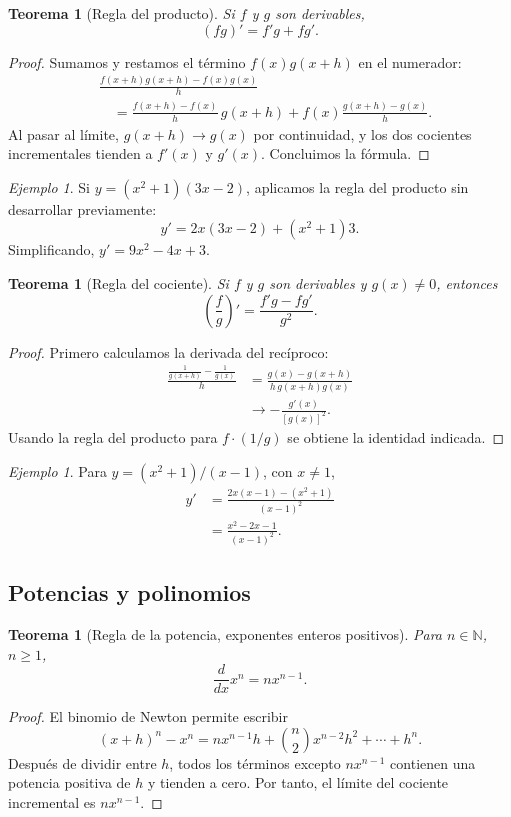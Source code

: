 \documentclass[12pt]{article}
\newtheorem{teorema}[definicion]{Teorema}
\theoremstyle{remark}
\newtheorem{ejemplo}[definicion]{Ejemplo}
\begin{document}
\begin{teorema}[Regla del producto]
Si $f$ y $g$ son derivables,
\[\boxed{(fg)'=f'g+fg'.}\]
\end{teorema}
\begin{proof}
Sumamos y restamos el término $f(x)g(x+h)$ en el numerador:
\begin{align*}
&\frac{f(x+h)g(x+h)-f(x)g(x)}h\\
&\quad=\frac{f(x+h)-f(x)}h\,g(x+h)
+f(x)\frac{g(x+h)-g(x)}h.
\end{align*}
Al pasar al límite, $g(x+h)\to g(x)$ por continuidad, y los dos cocientes incrementales tienden a $f'(x)$ y $g'(x)$. Concluimos la fórmula.
\end{proof}

\begin{ejemplo}
Si $y=(x^2+1)(3x-2)$, aplicamos la regla del producto sin desarrollar previamente:
\[
y'=2x(3x-2)+(x^2+1)3.
\]
Simplificando, $\boxed{y'=9x^2-4x+3}$.
\end{ejemplo}

\begin{teorema}[Regla del cociente]
Si $f$ y $g$ son derivables y $g(x)\ne0$, entonces
\[
\boxed{\left(\frac f g\right)'=\frac{f'g-fg'}{g^2}.}
\]
\end{teorema}
\begin{proof}
Primero calculamos la derivada del recíproco:
\begin{align*}
\frac{\frac1{g(x+h)}-\frac1{g(x)}}h
&=\frac{g(x)-g(x+h)}{h\,g(x+h)g(x)}\\
&\longrightarrow-\frac{g'(x)}{[g(x)]^2}.
\end{align*}
Usando la regla del producto para $f\cdot(1/g)$ se obtiene la identidad indicada.
\end{proof}

\begin{ejemplo}
Para $y=(x^2+1)/(x-1)$, con $x\ne1$,
\begin{align*}
y'&=\frac{2x(x-1)-(x^2+1)}{(x-1)^2}\\
&=\boxed{\frac{x^2-2x-1}{(x-1)^2}}.
\end{align*}
\end{ejemplo}

\subsection*{Potencias y polinomios}
\begin{teorema}[Regla de la potencia, exponentes enteros positivos]
Para $n\in\mathbb{N}$, $n\ge1$,
\[
\boxed{\frac{d}{dx}x^n=nx^{n-1}.}
\]
\end{teorema}
\begin{proof}
El binomio de Newton permite escribir
\[
(x+h)^n-x^n=nx^{n-1}h+\binom n2x^{n-2}h^2+\cdots+h^n.
\]
Después de dividir entre $h$, todos los términos excepto $nx^{n-1}$ contienen una potencia positiva de $h$ y tienden a cero. Por tanto, el límite del cociente incremental es $nx^{n-1}$.
\end{proof}
\end{document}
